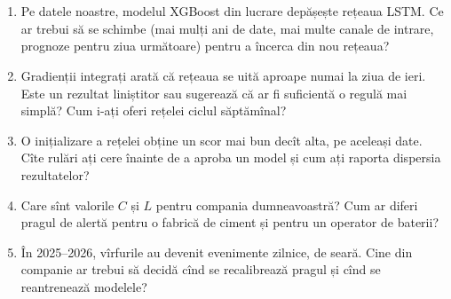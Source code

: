\section{}
\begin{enumerate}
\item {}%
{Pe datele noastre, modelul XGBoost din lucrare depășește rețeaua LSTM. Ce ar trebui să se schimbe (mai mulți ani de date, mai multe canale de intrare, prognoze pentru ziua următoare) pentru a încerca din nou rețeaua?}
\item {}%
{Gradienții integrați arată că rețeaua se uită aproape numai la ziua de ieri. Este un rezultat liniștitor sau sugerează că ar fi suficientă o regulă mai simplă? Cum i-ați oferi rețelei ciclul săptămînal?}
\item {}%
{O inițializare a rețelei obține un scor mai bun decît alta, pe aceleași date. Cîte rulări ați cere înainte de a aproba un model și cum ați raporta dispersia rezultatelor?}
\item {}%
{Care sînt valorile $C$ și $L$ pentru compania dumneavoastră? Cum ar diferi pragul de alertă pentru o fabrică de ciment și pentru un operator de baterii?}
\item {}%
{În 2025--2026, vîrfurile au devenit evenimente zilnice, de seară. Cine din companie ar trebui să decidă cînd se recalibrează pragul și cînd se reantrenează modelele?}
\end{enumerate}


